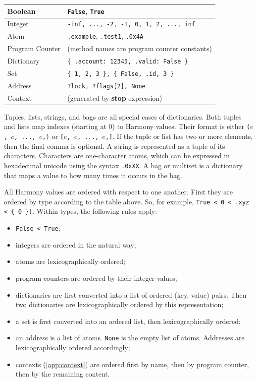 \documentclass{report}
\begin{document}
\vspace{1em}
\begin{tabular}{|l|l|}
\hline
Boolean & \texttt{False}, \texttt{True} \\
\hline
Integer & \texttt{-inf, ..., -2, -1, 0, 1, 2, ..., inf} \\
\hline
Atom & \texttt{.example}, \texttt{.test1}, \texttt{.0x4A} \\
\hline
Program Counter & (method names are program counter constants) \\
\hline
Dictionary & \texttt{\{ .account: 12345, .valid: False \} } \\
\hline
Set & \texttt{\{ 1, 2, 3 \}, \{ False, .id, 3 \} } \\
\hline
Address & \texttt{?lock, ?flags[2], None} \\
\hline
Context & (generated by \textbf{stop} expression) \\
\hline
\end{tabular}
\vspace{1em}

Tuples, lists, strings, and bags are all special cases of dictionaries.
Both tuples and lists map indexes (starting at 0) to Harmony values.
Their format is either \texttt{($e$, $e$, ..., $e$,)} or
\texttt{[$e$, $e$, ..., $e$,]}.
If the tuple or list has two or more elements, then the final comma
is optional.
A string is represented as a tuple of its characters.
Characters are one-character atoms, which can be expressed
in hexadecimal unicode using the syntax \texttt{.0xXX}.
A bag or multiset is a dictionary that maps a value to how many
times it occurs in the bag.

All Harmony values are ordered with respect to one another.  First they
are ordered by type according to the table above.
So, for example, \texttt{\texttt{True} < 0 < .xyz < \{ 0 \})}.
Within types, the following rules apply:

\begin{itemize}
\item \texttt{False < True};
\item integers are ordered in the natural way;
\item atoms are lexicographically ordered;
\item program counters are ordered by their integer values;
\item dictionaries are first converted into a list of ordered (key, value)
pairs.  Then two dictionaries are lexicographically ordered by this
representation;
\item a set is first converted into an ordered list, then lexicographically
ordered;
\item an address is a list of atoms.  \texttt{None} is the empty list of atoms.
Addresses are lexicographically ordered accordingly;
\item contexts (\autoref{app:context}) are ordered first by name, then by program counter, then by the remaining content.
\end{itemize}
\end{document}
